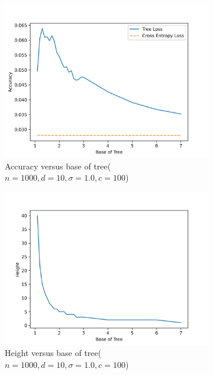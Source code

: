 \documentclass[twoside]{article}
\theoremstyle{definition}
\begin{document}
\begin{figure}
        \centering
        \begin{subfigure}[b]{0.45\textwidth}
            \centering
            \includegraphics[width=\textwidth]{fig/new_img/accuracy_vs_base.png}
            {{\small Accuracy versus base of tree($n=1000, d=10, \sigma=1.0, c=100$)}}
            \label{subfig.1}
        \end{subfigure}
        \hfill
        \begin{subfigure}[b]{0.45\textwidth}  
            \centering 
            \includegraphics[width=\textwidth]{fig/new_img/height_vs_base.png}
            {{\small Height versus base of tree($n=1000, d=10, \sigma=1.0, c=100$)}}   

\end{subfigure}
\end{figure}
\end{document}
